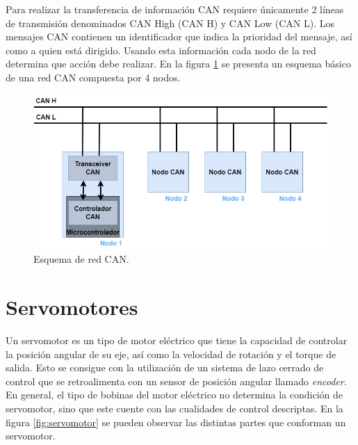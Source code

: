Para realizar la transferencia de información CAN requiere únicamente 2 líneas de transmisión denominados CAN High (CAN H) y CAN Low (CAN L). Los mensajes CAN contienen un identificador que indica la prioridad del mensaje, así como a quien está dirigido. Usando esta información cada nodo de la red determina que acción debe realizar. En la figura \ref{fig:canBus} se presenta un esquema básico de una red CAN compuesta por 4 nodos.


\begin{figure}[htbp]
	\centering
	\includegraphics[scale=.5]{./Figures/CANBUS_Esquema.png}
	\caption{Esquema de red CAN.}
	\label{fig:canBus}
\end{figure}


\section{Servomotores}

Un servomotor\citep{Industrial_Automation_Hands_On} es un tipo de motor eléctrico que tiene la capacidad de controlar la posición angular de su eje, así como la velocidad de rotación y el torque de salida. Esto se consigue con la utilización de un sistema de lazo cerrado de control que se retroalimenta con un sensor de posición angular llamado \textit{encoder}. En general, el tipo de bobinas del motor eléctrico no determina la condición de servomotor, sino que este cuente con las cualidades de control descriptas. En la figura \ref{fig:servomotor} \citep{web_partes_servomotor} se pueden observar las distintas partes que conforman un servomotor.


